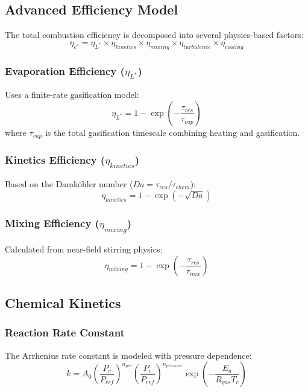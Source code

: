 \subsection{Advanced Efficiency Model}
The total combustion efficiency is decomposed into several physics-based factors:
\begin{equation}
\eta_{c^*} = \eta_{L^*} \times \eta_{kinetics} \times \eta_{mixing} \times \eta_{turbulence} \times \eta_{cooling}
\end{equation}

\subsubsection{Evaporation Efficiency (\(\eta_{L^*}\))}
Uses a finite-rate gasification model:
\begin{equation}
\eta_{L^*} = 1 - \exp\left(-\frac{\tau_{res}}{\tau_{vap}}\right)
\end{equation}
where \(\tau_{vap}\) is the total gasification timescale combining heating and gasification.

\subsubsection{Kinetics Efficiency (\(\eta_{kinetics}\))}
Based on the Damköhler number (\(Da = \tau_{res} / \tau_{chem}\)):
\begin{equation}
\eta_{kinetics} = 1 - \exp(-\sqrt{Da})
\end{equation}

\subsubsection{Mixing Efficiency (\(\eta_{mixing}\))}
Calculated from near-field stirring physics:
\begin{equation}
\eta_{mixing} = 1 - \exp\left(-\frac{\tau_{res}}{\tau_{mix}}\right)
\end{equation}

\subsection{Chemical Kinetics}

\subsubsection{Reaction Rate Constant}
The Arrhenius rate constant is modeled with pressure dependence:
\begin{equation}
k = A_0 \left(\frac{P_c}{P_{ref}}\right)^{n_{pre}} \left(\frac{P_c}{P_{ref}}\right)^{n_{pressure}} \exp\left(-\frac{E_a}{R_{gas} T_c}\right)
\end{equation}


